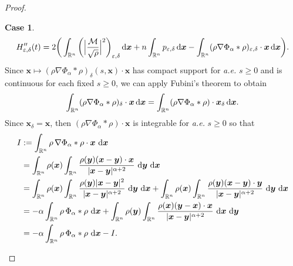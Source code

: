 \documentclass[reqno,11pt]{amsart}
\numberwithin{equation}{section}
\theoremstyle{definition}
\newtheorem{case}{Case}
\def\dd{{\, \rm d}}
\begin{document}
\begin{proof}
\begin{case}
\begin{equation}\label{weakdouble}
 H_{{\varepsilon},{\delta}}''(t)=2\bigg(\int_{\mathbb{R}^n} \bigg ( \Big| \frac{\mathcal{M}}{\sqrt{\rho}} \Big|^2 \bigg )_{{\varepsilon},{\delta}} \dd \boldsymbol{x}+n\int_{\mathbb{R}^n}p_{{\varepsilon},{\delta}}\dd \boldsymbol{x}-\int_{\mathbb{R}^n}(\rho\nabla\Phi_\alpha\ast\rho)_{{\varepsilon},{\delta}} \cdot \boldsymbol{x}\dd \boldsymbol{x}\bigg).
\end{equation}
Since $\boldsymbol{x} \mapsto 
(\rho\nabla\Phi_\alpha\ast\rho)_{{\delta}}(s,\boldsymbol{x}) \cdot \boldsymbol{x}$ 
has compact support for {\it a.e.} $s \geq 0$ and 
is continuous for each fixed $s\geq 0$,
we can apply Fubini's theorem to obtain
\begin{equation*}
 \int_{\mathbb{R}^n}(\rho\nabla\Phi_\alpha\ast\rho)_{{\delta}} \cdot \boldsymbol{x}\dd \boldsymbol{x} = \int_{\mathbb{R}^n}(\rho\nabla\Phi_\alpha\ast\rho) \cdot \boldsymbol{x}_{{\delta}} \dd \boldsymbol{x}.
\end{equation*}
Since $\boldsymbol{x}_{\delta} = \boldsymbol{x}$, then 
$(\rho\nabla\Phi_\alpha\ast\rho) \cdot \boldsymbol{x}$ is integrable 
for {\it a.e.} $s \geq 0$ so that
\begin{align*}\nonumber
I&:=\int_{\mathbb{R}^n}\rho\,\nabla\Phi_\alpha\ast\rho\cdot \boldsymbol{x}\,\dd \boldsymbol{x}\\
&=\int_{\mathbb{R}^n}\rho(\boldsymbol{x})\int_{\mathbb{R}^n}
\frac{\rho(\boldsymbol{y})(\boldsymbol{x}-\boldsymbol{y})\cdot \boldsymbol{x}}
{|\boldsymbol{x}-\boldsymbol{y}|^{\alpha+2}}
\,\dd \boldsymbol{y}\,\dd \boldsymbol{x}\\
&=\int_{\mathbb{R}^n}\rho(\boldsymbol{x})\int_{\mathbb{R}^n}
\frac{\rho(\boldsymbol{y})|\boldsymbol{x}-\boldsymbol{y}|^2}
{|\boldsymbol{x}-\boldsymbol{y}|^{\alpha+2}}
\,\dd \boldsymbol{y}\,\dd \boldsymbol{x}
+\int_{\mathbb{R}^n}\rho(\boldsymbol{x})\int_{\mathbb{R}^n}
\frac{\rho(\boldsymbol{y})(\boldsymbol{x}-\boldsymbol{y})\cdot \boldsymbol{y}}
{|\boldsymbol{x}-\boldsymbol{y}|^{\alpha+2}}
\,\dd \boldsymbol{y}\,\dd \boldsymbol{x}\\
&=-\alpha\int_{\mathbb{R}^n}\rho\,\Phi_\alpha\ast\rho\,\dd \boldsymbol{x}
+\int_{\mathbb{R}^n}\rho(\boldsymbol{y})\int_{\mathbb{R}^n}
\frac{\rho(\boldsymbol{x})(\boldsymbol{y}-\boldsymbol{x})\cdot \boldsymbol{x}}
{|\boldsymbol{x}-\boldsymbol{y}|^{\alpha+2}}
\,\dd \boldsymbol{x}\,\dd \boldsymbol{y}\\
&=-\alpha\int_{\mathbb{R}^n}\rho\,\Phi_\alpha\ast\rho\,\dd \boldsymbol{x}-I.
 \end{align*}

\end{case}
\end{proof}
\end{document}
